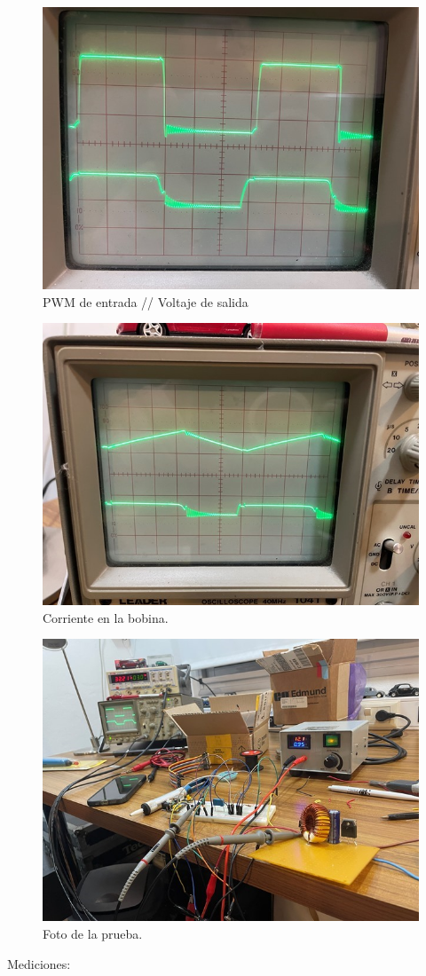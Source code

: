\begin{figure}[H]
    \centering
    \includegraphics[width=0.75\linewidth]{informes/IMG_8823.jpg}
    \caption{PWM de entrada // Voltaje de salida}
\end{figure}

\begin{figure}[H]
    \centering
    \includegraphics[width=0.75\linewidth]{informes/IMG_8827.jpg}
    \caption{Corriente en la bobina.}
    
\end{figure}

\begin{figure}[H]
    \centering
    \includegraphics[width=0.75\linewidth]{informes/IMG_8824.jpg}
    \caption{Foto de la prueba.}
    
\end{figure}
Mediciones:

